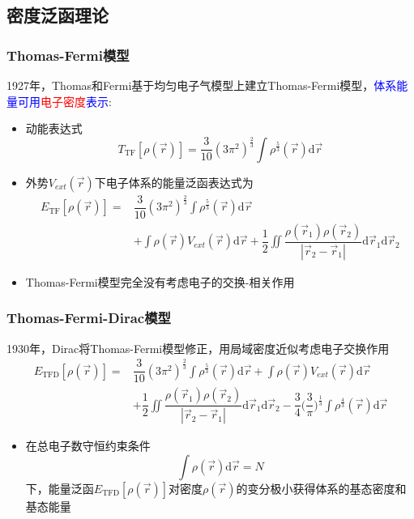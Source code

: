 \documentclass[cjk,slidestop,compress,mathserif,blue]{beamer}
\begin{document}
\subsection{密度泛函理论}       %
\frame
{
	\frametitle{\textrm{Thomas-Fermi}模型} 
	1927年，\textrm{Thomas}和\textrm{Fermi}基于均匀电子气模型上建立\textrm{Thomas-Fermi}模型，\textcolor{blue}{体系能量可用}\textcolor{red}{电子密度}\textcolor{blue}{表示}:
	\begin{itemize}
		\item 动能表达式
			$$T_{\mathrm{TF}}[\rho(\vec r)]=\dfrac3{10}(3\pi^2)^{\frac23}\int\rho^{\frac53}(\vec r)\mathrm{d}\vec r$$
		\item 外势$V_{ext}(\vec r)$下电子体系的能量泛函表达式为
			\begin{displaymath}
				\begin{aligned}
					E_{\mathrm{TF}}[\rho(\vec r)]=&\dfrac3{10}(3\pi^2)^{\frac23}\int\rho^{\frac53}(\vec r)\mathrm{d}\vec r\\
					&+\int\rho(\vec r)V_{ext}(\vec r)\mathrm{d}\vec r+\dfrac12\iint\dfrac{\rho(\vec r_1)\rho(\vec r_2)}{|\vec r_2-\vec r_1|}\mathrm{d}\vec r_1\mathrm{d}\vec r_2
				\end{aligned}
			\end{displaymath}
		\item \textrm{Thomas-Fermi}模型完全没有考虑电子的交换-相关作用
	\end{itemize}
}

\frame
{
	\frametitle{\textrm{Thomas-Fermi-Dirac}模型} 
	1930年，\textrm{Dirac}将\textrm{Thomas-Fermi}模型修正，用局域密度近似考虑电子交换作用
			\begin{displaymath}
				\begin{aligned}
					E_{\mathrm{TFD}}[\rho(\vec r)]=&\dfrac3{10}(3\pi^2)^{\frac23}\int\rho^{\frac53}(\vec r)\mathrm{d}\vec r+\int\rho(\vec r)V_{ext}(\vec r)\mathrm{d}\vec r\\
					&+\dfrac12\iint\dfrac{\rho(\vec r_1)\rho(\vec r_2)}{|\vec r_2-\vec r_1|}\mathrm{d}\vec r_1\mathrm{d}\vec r_2-\dfrac34\bigg(\dfrac3{\pi}\bigg)^{\frac13}\int\rho^{\frac43}(\vec r)\mathrm{d}\vec r
				\end{aligned}
			\end{displaymath}
			\begin{itemize}
				\item 在总电子数守恒约束条件
					$$\int\rho(\vec r)\mathrm{d}\vec r=N$$
					下，能量泛函$E_{\mathrm{TFD}}[\rho(\vec r)]$对密度$\rho(\vec r)$的变分极小获得体系的基态密度和基态能量
			\end{itemize}
}
\end{document}
